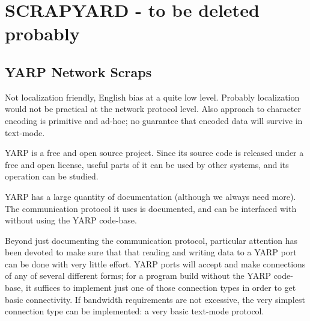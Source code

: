 

\section{SCRAPYARD - to be deleted probably}


\subsection*{YARP Network Scraps}

Not localization friendly, English bias at a quite low level.
Probably localization would not be practical at the network
protocol level.  Also approach to character encoding is
primitive and ad-hoc; no guarantee that encoded data
will survive in text-mode.



YARP is a free and open source project.  Since its source code is
released under a free and open license, useful parts of it can be used
by other systems, and its operation can be studied.

YARP has a large quantity of documentation (although we always need
more).  The communication protocol it uses is documented, and can be
interfaced with without using the YARP code-base.

Beyond just documenting the communication protocol, particular attention
has been devoted to make sure that that reading and writing data to a
YARP port can be done with very little effort.  YARP ports will 
accept and make connections of any of several different forms;
for a program build without the YARP code-base, it suffices
to implement just one of those connection types in order to
get basic connectivity.  If bandwidth requirements are not
excessive, the very simplest connection type can be implemented:
a very basic text-mode protocol.


